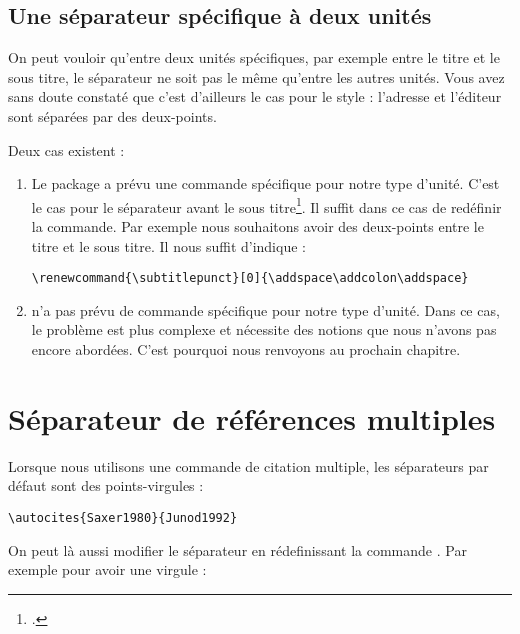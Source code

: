 	
\subsection{Une séparateur spécifique à deux unités}
	
	On peut vouloir qu'entre deux unités spécifiques, par exemple entre le titre et le sous titre, le séparateur ne soit pas le même qu'entre les autres unités.	Vous avez sans doute constaté que c'est d'ailleurs le cas pour le style  : l'adresse et l'éditeur sont séparées par des deux-points.
	
	Deux cas existent :
		\begin{enumerate}
			\item Le package  a prévu une commande spécifique pour notre type d'unité. C'est le cas pour le séparateur avant le sous titre\footcite[Ces commandes sont peu nombreuse : on les trouvera dans][]{biblatex_hooks}. Il suffit dans ce cas de redéfinir la commande. Par exemple nous souhaitons avoir des deux-points entre le titre et le sous titre. Il nous suffit d'indique :
			\begin{verbatim}
\renewcommand{\subtitlepunct}[0]{\addspace\addcolon\addspace}
			\end{verbatim}
			
			\item {} n'a pas prévu de commande spécifique pour notre type d'unité. Dans ce cas, le problème est plus complexe et nécessite des notions que nous n'avons pas encore abordées. C'est pourquoi nous renvoyons au prochain chapitre.
		\end{enumerate}
		
\section{Séparateur de références multiples}\label{multicitedelim}

Lorsque nous utilisons une commande de citation multiple, les séparateurs par défaut sont des points-virgules :

\begin{verbatim}
\autocites{Saxer1980}{Junod1992}
\end{verbatim}

\begin{quotation}
\cites{Saxer1980}{Junod1992}
\end{quotation}

On peut là aussi modifier le séparateur en rédefinissant la commande . Par exemple pour avoir une virgule :

